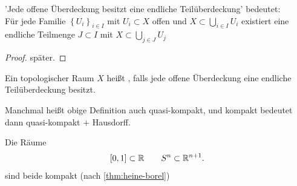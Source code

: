 \begin{recap}
    'Jede offene Überdeckung besitzt eine endliche Teilüberdeckung' bedeutet: \\
    Für jede Familie $\left \{U_i\right\} _{i \in I}$ mit $U_i \subset X$ offen und $X \subset \bigcup_{i \in I}U_i$ existiert eine endliche Teilmenge $J\subset I$ mit $X \subset \bigcup_{j\in J} U_j$
\end{recap}
\begin{proof}
    später.
\end{proof}

\begin{definition}[Kompaktheit]\label{def:kompakt}
    Ein topologischer Raum $X$ heißt  , falls jede offene Überdeckung eine endliche Teilüberdeckung besitzt.
\end{definition}
\begin{remark}
    Manchmal heißt obige Definition auch quasi-kompakt, und kompakt bedeutet dann quasi-kompakt + Hausdorff.
\end{remark}

\begin{example}
   Die Räume
   \[
       [0,1] \subset \mathbb{R} \qquad S^n \subset \mathbb{R}^{n+1}
   .\] 
   sind beide kompakt (nach \ref{thm:heine-borel})
\end{example}
